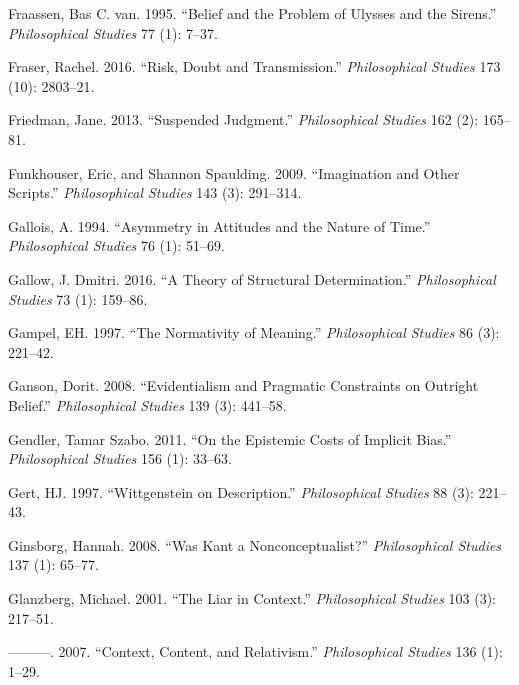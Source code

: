 \documentclass[
  10pt,
  letterpaper,
  DIV=11,
  numbers=noendperiod,
  twoside]{scrartcl}
\newlength{\cslhangindent}
\newenvironment{CSLReferences}[2] %
 {\begin{list}{}{%
  \setlength{\itemindent}{0pt}
  \setlength{\leftmargin}{0pt}
  \setlength{\parsep}{0pt}
  \ifodd #1
   \setlength{\leftmargin}{\cslhangindent}
   \setlength{\itemindent}{-1\cslhangindent}
  \fi
  \setlength{\itemsep}{#2\baselineskip}}}
 {\end{list}}
\begin{document}
\begin{CSLReferences}{1}{0}
Fraassen, Bas C. van. 1995. {``Belief and the Problem of Ulysses and the
Sirens.''} \emph{Philosophical Studies} 77 (1): 7--37.

Fraser, Rachel. 2016. {``Risk, Doubt and Transmission.''}
\emph{Philosophical Studies} 173 (10): 2803--21.

Friedman, Jane. 2013. {``Suspended Judgment.''} \emph{Philosophical
Studies} 162 (2): 165--81.

Funkhouser, Eric, and Shannon Spaulding. 2009. {``Imagination and Other
Scripts.''} \emph{Philosophical Studies} 143 (3): 291--314.

Gallois, A. 1994. {``Asymmetry in Attitudes and the Nature of Time.''}
\emph{Philosophical Studies} 76 (1): 51--69.

Gallow, J. Dmitri. 2016. {``A Theory of Structural Determination.''}
\emph{Philosophical Studies} 73 (1): 159--86.

Gampel, EH. 1997. {``The Normativity of Meaning.''} \emph{Philosophical
Studies} 86 (3): 221--42.

Ganson, Dorit. 2008. {``Evidentialism and Pragmatic Constraints on
Outright Belief.''} \emph{Philosophical Studies} 139 (3): 441--58.

Gendler, Tamar Szabo. 2011. {``On the Epistemic Costs of Implicit
Bias.''} \emph{Philosophical Studies} 156 (1): 33--63.

Gert, HJ. 1997. {``Wittgenstein on Description.''} \emph{Philosophical
Studies} 88 (3): 221--43.

Ginsborg, Hannah. 2008. {``Was Kant a Nonconceptualist?''}
\emph{Philosophical Studies} 137 (1): 65--77.

Glanzberg, Michael. 2001. {``The Liar in Context.''} \emph{Philosophical
Studies} 103 (3): 217--51.

---------. 2007. {``Context, Content, and Relativism.''}
\emph{Philosophical Studies} 136 (1): 1--29.


\end{CSLReferences}
\end{document}
